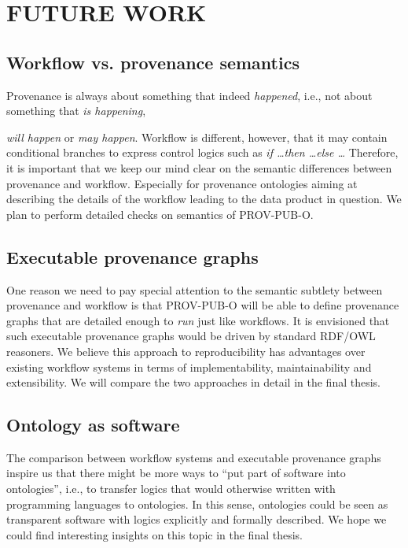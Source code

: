 \chapter{FUTURE WORK}
\label{future-work}
\section{Workflow vs. provenance semantics}
Provenance is always about something that indeed \emph{happened}, i.e., not about something that \emph{is happening}, {\emph{will happen} or \emph{may happen}. Workflow is different, however, that it may contain conditional branches to express control logics such as \emph{if \dots then \dots else \dots} Therefore, it is important that we keep our mind clear on the semantic differences between provenance and workflow. Especially for provenance ontologies aiming at describing the details of the workflow leading to the data product in question. We plan to perform detailed checks on semantics of PROV-PUB-O.

\section{Executable provenance graphs}
One reason we need to pay special attention to the semantic subtlety between provenance and workflow is that PROV-PUB-O will be able to define provenance graphs that are detailed enough to \emph{run} just like workflows. It is envisioned that such executable provenance graphs would be driven by standard RDF/OWL reasoners. We believe this approach to reproducibility has advantages over existing workflow systems in terms of implementability, maintainability and extensibility. We will compare the two approaches in detail in the final thesis.

\section{Ontology as software}
The comparison between workflow systems and executable provenance graphs inspire us that there might be more ways to ``put part of software into ontologies'', i.e., to transfer logics that would otherwise written with programming languages to ontologies. In this sense, ontologies could be seen as transparent software with logics explicitly and formally described. We hope we could find interesting insights on this topic in the final thesis.

}

